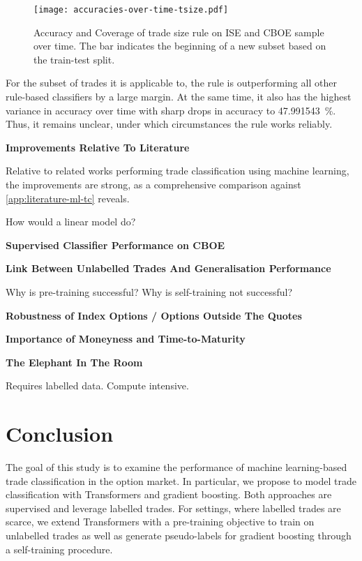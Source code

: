 \begin{figure}[!h]
    \centering
    \texttt{[image: accuracies-over-time-tsize.pdf]}
    \caption[Accuracy and Coverage of Trade Size Rule Over Time]{Accuracy and Coverage of trade size rule on \gls{ISE} and \gls{CBOE} sample over time. The bar \myline{} indicates the beginning of a new subset based on the train-test split.}
    \label{fig:accuracies-over-time-tsize}
\end{figure}

For the subset of trades it is applicable to, the rule is outperforming all other rule-based classifiers by a large margin. At the same time, it also has the highest variance in accuracy over time with sharp drops in accuracy to \SI{47.991543}{\percent}. Thus, it remains unclear, under which circumstances the rule works reliably.

\textbf{Improvements Relative To Literature}

Relative to related works performing trade classification using machine learning, the improvements are strong, as a comprehensive comparison against \cref{app:literature-ml-tc} reveals.

How would a linear model do?


\textbf{Supervised Classifier Performance on \gls{CBOE}}

\textbf{Link Between Unlabelled Trades And Generalisation Performance}

Why is pre-training successful? Why is self-training not successful?

\textbf{Robustness of Index Options / Options Outside The Quotes}

\textbf{Importance of Moneyness and Time-to-Maturity}

\textbf{The Elephant In The Room}

Requires labelled data. Compute intensive.

\newpage
\section{Conclusion}\label{sec:conclusion}


The goal of this study is to examine the performance of machine learning-based trade classification in the option market. In particular, we propose to model trade classification with Transformers and gradient boosting. Both approaches are supervised and leverage labelled trades. For settings, where labelled trades are scarce, we extend Transformers with a pre-training objective to train on unlabelled trades as well as generate pseudo-labels for gradient boosting through a self-training procedure.

